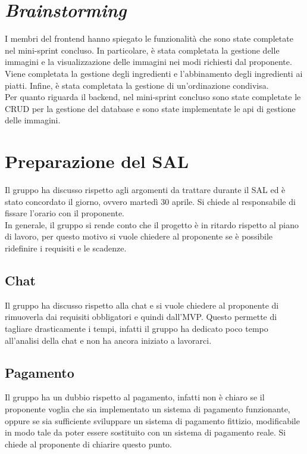 \section{\textit{Brainstorming}}

I membri del frontend hanno spiegato le funzionalità che sono state completate
nel mini-sprint concluso. In particolare, è stata completata la gestione delle
immagini e la visualizzazione delle immagini nei modi richiesti dal proponente.
Viene completata la gestione degli ingredienti e l'abbinamento degli ingredienti
ai piatti. Infine, è stata completata la gestione di un'ordinazione condivisa.\\
Per quanto riguarda il backend, nel mini-sprint concluso sono state completate
le CRUD per la gestione del database e sono state implementate le api di
gestione delle immagini.

\section{Preparazione del SAL}

Il gruppo ha discusso rispetto agli argomenti da trattare durante il SAL ed è
stato concordato il giorno, ovvero martedì 30 aprile. Si chiede al responsabile
di fissare l'orario con il proponente.\\
In generale, il gruppo si rende conto che il progetto è in ritardo rispetto al
piano di lavoro, per questo motivo si vuole chiedere al proponente se è
possibile ridefinire i requisiti e le scadenze.

\subsection{Chat}

Il gruppo ha discusso rispetto alla chat e si vuole chiedere al proponente di
rimuoverla dai requisiti obbligatori e quindi dall'MVP. Questo permette di
tagliare drasticamente i tempi, infatti il gruppo ha dedicato poco tempo
all'analisi della chat e non ha ancora iniziato a lavorarci.

\subsection{Pagamento}

Il gruppo ha un dubbio rispetto al pagamento, infatti non è chiaro se il
proponente voglia che sia implementato un sistema di pagamento funzionante,
oppure se sia sufficiente sviluppare un sistema di pagamento fittizio,
modificabile in modo tale da poter essere sostituito con un sistema di pagamento
reale. Si chiede al proponente di chiarire questo punto.

